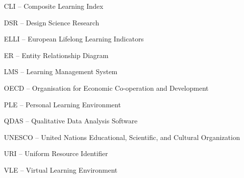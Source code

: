 CLI -- Composite Learning Index

DSR -- Design Science Research

ELLI -- European Lifelong Learning Indicators

ER -- Entity Relationship Diagram

LMS -- Learning Management System

OECD -- Organisation for Economic Co-operation and Development

PLE -- Personal Learning Environment

QDAS -- Qualitative Data Analysis Software

UNESCO -- United Nations Educational, Scientific, and Cultural Organization

URI -- Uniform Resource Identifier

VLE -- Virtual Learning Environment




